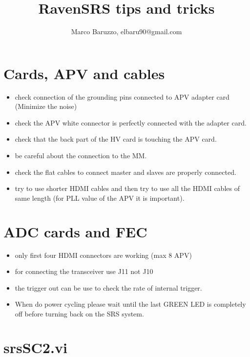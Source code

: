 \documentclass[a4paper,12pt]{article}
\title{RavenSRS tips and tricks}
\author{Marco Baruzzo, elbaru90@gmail.com}
\begin{document}
	\maketitle

	\titlepage

	\tableofcontents
	\newpage

	\section{Cards, APV and cables}
		\begin{itemize}
			\item check connection of the grounding pins connected to APV adapter card (Minimize the noise)
			\item check the APV white connector is perfectly connected with the adapter card.
			\item check that the back part of the HV card is touching the APV card.
			\item be careful about the connection to the MM.
			\item check the flat cables to connect master and slaves are properly connected.
			\item try to use shorter HDMI cables and then try to use all the HDMI cables of same length (for PLL value of the APV it is important).
		\end{itemize}

	\section{ADC cards and FEC}
		\begin{itemize}
			\item only first four HDMI connectors are working (max 8 APV)
			\item for connecting the transceiver use J11 not J10
			\item the trigger out can be use to check the rate of internal trigger.
			\item When do power cycling please wait until the last GREEN LED is completely off before turning back on the SRS system.
		\end{itemize}

	\section{srsSC2.vi}
\end{document}
